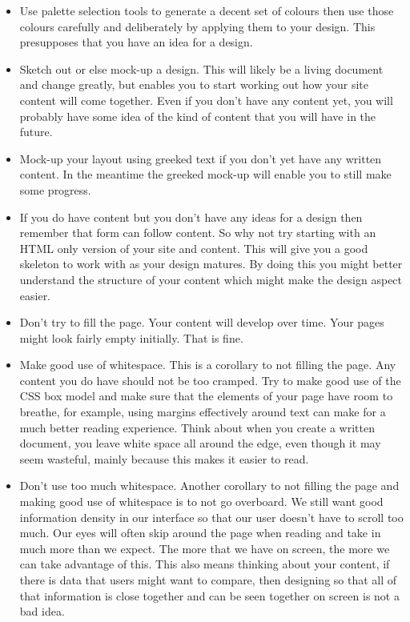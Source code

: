 \begin{itemize}
\item Use palette selection tools to generate a decent set of colours then use those colours carefully and deliberately by applying them to your design. This presupposes that you have an idea for a design.
\item Sketch out or else mock-up a design. This will likely be a living document and change greatly, but enables you to start working out how your site content will come together. Even if you don't have any content yet, you will probably have some idea of the kind of content that you will have in the future.
\item Mock-up your layout using greeked text if you don't yet have any written content. In the meantime the greeked mock-up will enable you to still make some progress.
\item If you do have content but you don't have any ideas for a design then remember that form can follow content. So why not try starting with an HTML only version of your site and content. This will give you a good skeleton to work with as your design matures. By doing this you might better understand the structure of your content which might make the design aspect easier.
\item Don't try to fill the page. Your content will develop over time. Your pages might look fairly empty initially. That is fine.
\item Make good use of whitespace. This is a corollary to not filling the page. Any content you do have should not be too cramped. Try to make good use of the CSS box model and make sure that the elements of your page have room to breathe, for example, using margins effectively around text can make for a much better reading experience. Think about when you create a written document, you leave white space all around the edge, even though it may seem wasteful, mainly because this makes it easier to read.
\item Don’t use too much whitespace. Another corollary to not filling the page and making good use of whitespace is to not go overboard. We still want good information density in our interface so that our user doesn't have to scroll too much. Our eyes will often skip around the page when reading and take in much more than we expect. The more that we have on screen, the more we can take advantage of this. This also means thinking about your content, if there is data that users might want to compare, then designing so that all of that information is close together and can be seen together on screen is not a bad idea.

\end{itemize}
